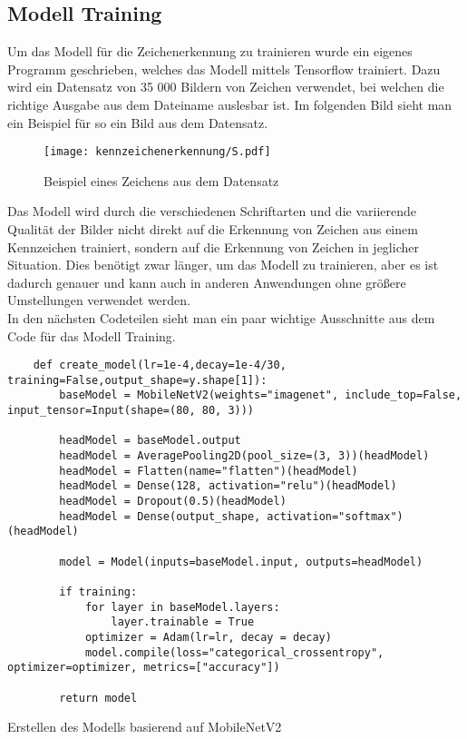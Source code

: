 \subsection{Modell Training}
Um das Modell für die Zeichenerkennung zu trainieren wurde ein eigenes Programm geschrieben, welches das Modell mittels Tensorflow trainiert. 
Dazu wird ein Datensatz von 35 000 Bildern von Zeichen verwendet, bei welchen die richtige Ausgabe aus dem Dateiname auslesbar ist. 
Im folgenden Bild sieht man ein Beispiel für so ein Bild aus dem Datensatz.

\begin{figure}[H]
    \centering
    \texttt{[image: kennzeichenerkennung/S.pdf]}
    \caption{Beispiel eines Zeichens aus dem Datensatz}
\end{figure}

Das Modell wird durch die verschiedenen Schriftarten und die variierende Qualität der Bilder nicht direkt auf die Erkennung von Zeichen aus 
einem Kennzeichen trainiert, sondern auf die Erkennung von Zeichen in jeglicher Situation. Dies benötigt zwar länger, um das Modell zu trainieren, 
aber es ist dadurch genauer und kann auch in anderen Anwendungen ohne größere Umstellungen verwendet werden.\\

In den nächsten Codeteilen sieht man ein paar wichtige Ausschnitte aus dem Code für das Modell Training.

\begin{longlisting}
    \begin{verbatim}
    def create_model(lr=1e-4,decay=1e-4/30, training=False,output_shape=y.shape[1]):
        baseModel = MobileNetV2(weights="imagenet", include_top=False, input_tensor=Input(shape=(80, 80, 3)))

        headModel = baseModel.output
        headModel = AveragePooling2D(pool_size=(3, 3))(headModel)
        headModel = Flatten(name="flatten")(headModel)
        headModel = Dense(128, activation="relu")(headModel)
        headModel = Dropout(0.5)(headModel)
        headModel = Dense(output_shape, activation="softmax")(headModel)

        model = Model(inputs=baseModel.input, outputs=headModel)

        if training:
            for layer in baseModel.layers:
                layer.trainable = True
            optimizer = Adam(lr=lr, decay = decay)
            model.compile(loss="categorical_crossentropy", optimizer=optimizer, metrics=["accuracy"])
    
        return model
    \end{verbatim}
    \caption{Erstellen des Modells basierend auf MobileNetV2}
\end{longlisting}

